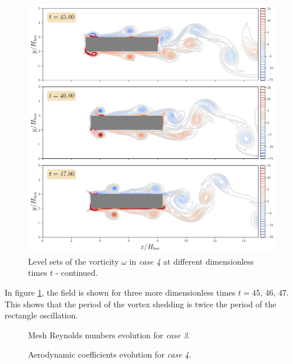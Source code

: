 \documentclass[11 pt]{article}
\begin{document}
\begin{figure}[H]
    \centering
    \includegraphics[width=\textwidth]{../figures/vorticity_case_4_part2.png}
    \caption{Level sets of the vorticity $\omega$ in \textit{case 4} at different dimensionless times $t$ - continued.}
    \label{fig:vorticity_4b}
\end{figure}

In figure \ref{fig:vorticity_4b}, the field is shown for three more dimensionless times $t=45,\, 46,\, 47$. This shows that the period of the vortex shedding is twice the period of the rectangle oscillation.

\begin{figure}[H]
    \centering
    
    \caption{Mesh Reynolds numbers evolution for \textit{case 3}.}
    \label{fig:mesh_re_case4}
\end{figure}

\begin{figure}[H]
    \centering
    
    \caption{Aerodynamic coefficients evolution for \textit{case 4}.}
    \label{fig:drag_case4}
\end{figure}

%     
\end{document}
